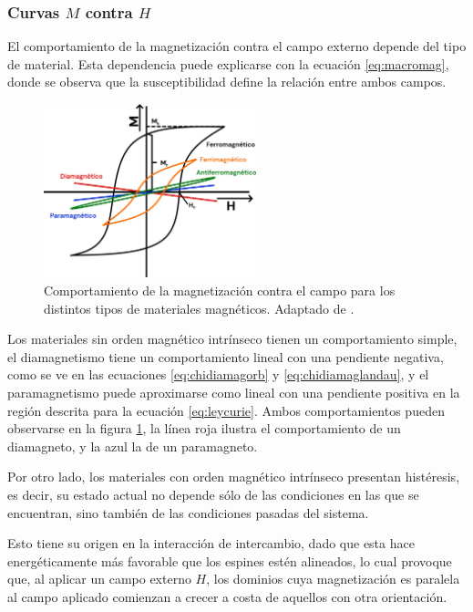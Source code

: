 \documentclass[../main.tex]{subfiles}
\begin{document}
\subsubsection{Curvas \texorpdfstring{$M$}{M} contra \texorpdfstring{$H$}{H}}
El comportamiento de la magnetización contra el campo externo depende del tipo de material. Esta dependencia puede explicarse con la ecuación \ref{eq:macromag}, donde se observa que la susceptibilidad define la relación entre ambos campos.
\begin{figure}[H]
    \centering
    \includegraphics[width=0.55\textwidth]{fig/histeresis1.jpg}
    \caption{Comportamiento de la magnetización contra el campo para los distintos tipos de materiales magnéticos. Adaptado de \cite{Buschow2003}.}
    \label{fig:campomag}
\end{figure}
Los materiales sin orden magnético intrínseco tienen un comportamiento simple, el diamagnetismo tiene un comportamiento lineal con una pendiente negativa, como se ve en las ecuaciones \ref{eq:chidiamagorb} y \ref{eq:chidiamaglandau}, y el paramagnetismo puede aproximarse como lineal con una pendiente positiva en la región descrita para la ecuación \ref{eq:leycurie}. Ambos comportamientos pueden observarse en la figura \ref{fig:campomag}, la línea roja ilustra el comportamiento de un diamagneto, y la azul la de un paramagneto.

Por otro lado, los materiales con orden magnético intrínseco presentan histéresis, es decir, su estado actual no depende sólo de las condiciones en las que se encuentran, sino también de las condiciones pasadas del sistema.

Esto tiene su origen en la interacción de intercambio, dado que esta hace energéticamente más favorable que los espines estén alineados, lo cual provoque que, al aplicar un campo externo $H$, los dominios cuya magnetización es paralela al campo aplicado comienzan a crecer a costa de aquellos con otra orientación.
\end{document}
